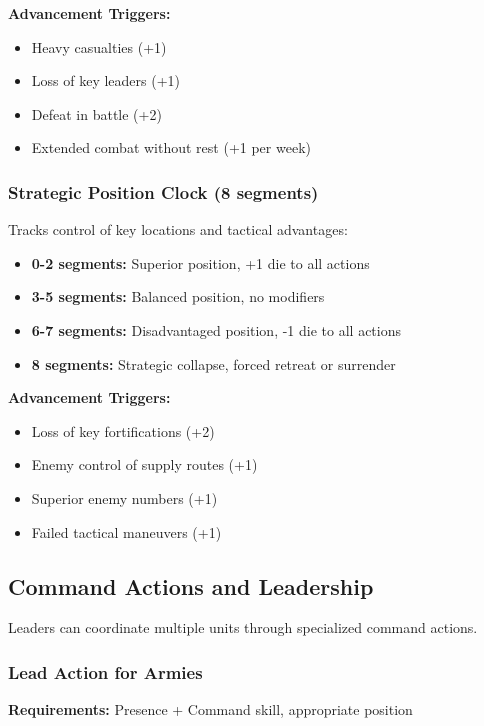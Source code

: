\textbf{Advancement Triggers:}
\begin{itemize}[leftmargin=*]
    \item Heavy casualties (+1)
    \item Loss of key leaders (+1)
    \item Defeat in battle (+2)
    \item Extended combat without rest (+1 per week)
\end{itemize}

\subsubsection{Strategic Position Clock (8 segments)}

Tracks control of key locations and tactical advantages:
\begin{itemize}[leftmargin=*]
    \item \textbf{0-2 segments:} Superior position, +1 die to all actions
    \item \textbf{3-5 segments:} Balanced position, no modifiers
    \item \textbf{6-7 segments:} Disadvantaged position, -1 die to all actions
    \item \textbf{8 segments:} Strategic collapse, forced retreat or surrender
\end{itemize}

\textbf{Advancement Triggers:}
\begin{itemize}[leftmargin=*]
    \item Loss of key fortifications (+2)
    \item Enemy control of supply routes (+1)
    \item Superior enemy numbers (+1)
    \item Failed tactical maneuvers (+1)
\end{itemize}

\subsection{Command Actions and Leadership}

Leaders can coordinate multiple units through specialized command actions.

\subsubsection{Lead Action for Armies}

\textbf{Requirements:} Presence + Command skill, appropriate position

